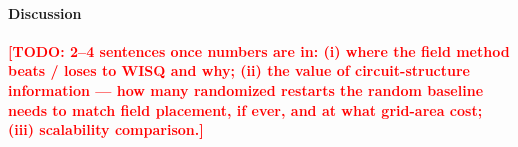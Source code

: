 \documentclass[10pt,conference]{IEEEtran}
\theoremstyle{definition}
\theoremstyle{remark}
\newcommand{\SWAP}{\mathrm{SWAP}}
\newcommand{\NP}{\mathsf{NP}}
\newcommand{\todo}[1]{\textcolor{red}{\textbf{[TODO: #1]}}}
\begin{document}
\paragraph{Discussion}
\todo{2--4 sentences once numbers are in:
(i) where the field method beats / loses to WISQ and why; (ii) the value of
circuit-structure information --- how many randomized restarts the random
baseline needs to match field placement, if ever, and at what grid-area cost;
(iii) scalability comparison.}





\end{document}
